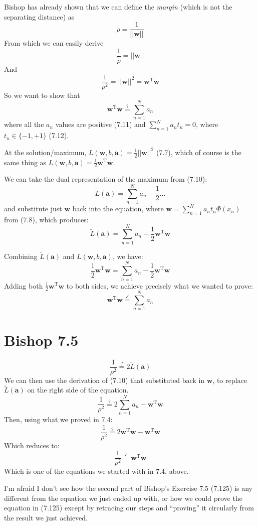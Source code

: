 \documentclass[11pt]{report}
\begin{document}
Bishop has already shown that we can define the \emph{margin} (which is not the separating distance) as
\[ \rho = \frac{1}{||\mathbf{w}||} \]
From which we can easily derive
\[ \frac{1}{\rho} = ||\mathbf{w}|| \]
And
\[ \frac{1}{\rho^2} = ||\mathbf{w}||^2 = \mathbf{w}^\text{T}\mathbf{w} \]
So we want to show that 
\[ \mathbf{w}^\text{T}\mathbf{w} \overset{?}{=} \sum^N_{n=1} a_n \]
where all the $a_n$ values are positive (7.11) and \( \sum^N_{n=1} a_nt_n = 0 \), where $t_n \in \{-1, +1\}$ (7.12).

\medskip\noindent
At the solution/maximum, \(L(\mathbf{w}, b, \mathbf{a}) = \frac{1}{2}||\mathbf{w}||^2\) (7.7), which of course is the same thing as \(L(\mathbf{w}, b, \mathbf{a}) = \frac{1}{2}\mathbf{w}^\text{T}\mathbf{w}\).

We can take the dual representation of the maximum from (7.10):
\[\tilde{L}(\mathbf{a}) = \sum^N_{n=1} a_n - \frac{1}{2}\dots \]
and substitute just $\mathbf{w}$ back into the equation, where $\mathbf{w} = \sum^N_{n=1} a_nt_n\Phi(x_n)$ from (7.8), which produces:
\[ \tilde{L}(\mathbf{a}) = \sum^N_{n=1} a_n - \frac{1}{2} \mathbf{w}^\text{T}\mathbf{w} \]

Combining $\tilde{L}(\mathbf{a})$ and $L(\mathbf{w}, b, \mathbf{a})$, we have:
\[
  \frac{1}{2}\mathbf{w}^\text{T}\mathbf{w} = \sum^N_{n=1} a_n - \frac{1}{2} \mathbf{w}^\text{T}\mathbf{w}
\]
Adding both $\frac{1}{2}\mathbf{w}^\text{T}\mathbf{w}$ to both sides, we achieve precisely what we wanted to prove:
\[ \mathbf{w}^\text{T}\mathbf{w} \overset{\checkmark}{=} \sum^N_{n=1} a_n \]

\section{Bishop 7.5}

\[
  \frac{1}{\rho^2} \overset{?}{=} 2\tilde{L}(\mathbf{a})
\]
We can then use the derivation of (7.10) that substituted back in $\textbf{w}$, to replace $\tilde{L}(\mathbf{a})$ on the right side of the equation.
\[
  \frac{1}{\rho^2} \overset{?}{=} 2\sum^N_{n=1} a_n - \textbf{w}^\text{T}\textbf{w}
\]
Then, using what we proved in 7.4:
\[
  \frac{1}{\rho^2} \overset{?}{=} 2\textbf{w}^\text{T}\textbf{w} - \textbf{w}^\text{T}\textbf{w}
\]
Which reduces to:
\[
  \frac{1}{\rho^2} \overset{\checkmark}{=} \textbf{w}^\text{T}\textbf{w}
\]
Which is one of the equations we started with in 7.4, above.

\medskip\noindent
I'm afraid I don't see how the second part of Bishop's Exercise 7.5 (7.125) is any different from the equation we just ended up with, or how we could prove the equation in (7.125) except by retracing our steps and ``proving'' it circularly from the result we just achieved.
\end{document}
